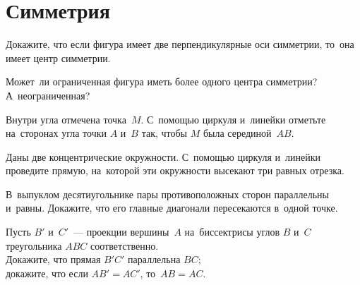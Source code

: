 
\section*{Симметрия}


\begin{problems}


\item
Докажите, что если фигура имеет две перпендикулярные оси симметрии, то~она
имеет центр симметрии.

\item
Может~ли ограниченная фигура иметь более одного центра симметрии?
А~неограниченная?


\item
Внутри угла отмечена точка~$M$.
С~помощью циркуля и~линейки отметьте на~сторонах угла точки $A$ и~$B$ так,
чтобы $M$ была серединой~$AB$.


\item
Даны две концентрические окружности.
С~помощью циркуля и~линейки проведите прямую, на~которой эти окружности
высекают три равных отрезка.

\item
В~выпуклом десятиугольнике пары противоположных сторон параллельны и~равны.
Докажите, что его главные диагонали пересекаются в~одной точке.

\item
Пусть $B'$ и~$C'$~--- проекции вершины~$A$ на~биссектрисы углов $B$ и~$C$
треугольника $ABC$ соответственно.
\\
\subproblem
Докажите, что прямая $B'C'$ параллельна $BC$;
\\
\subproblem
докажите, что если $AB' = AC'$, то~$AB = AC$.


\end{problems}
